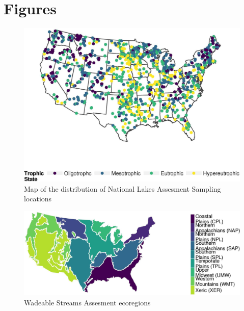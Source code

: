\documentclass[12pt,]{article}
\begin{document}
\newpage

\section{Figures}\label{figures}

\begin{figure}[htbp]
\centering
\includegraphics{manuscript_files/figure-latex/fig1_nlaMap-1.jpeg}
\caption{Map of the distribution of National Lakes Assesment Sampling
locations \label{fig:nlaMap}}
\end{figure}

\newpage

\begin{figure}[htbp]
\centering
\includegraphics{manuscript_files/figure-latex/ecoregion_map-1.jpeg}
\caption{Wadeable Streams Assesment ecoregions
\label{fig:ecoregion_map}}
\end{figure}

\newpage
\end{document}
